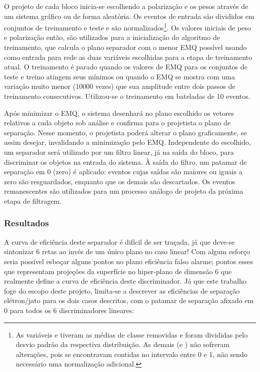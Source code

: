 O projeto de cada bloco inicia-se escolhendo a polarização e os pesos através
de um sistema gráfico ou de forma aleatória. Os eventos de entrada são
divididos em conjuntos de treinamento e teste e são normalizados\footnote{As
variáveis \etem e \ethad tiveram as médias de classe removidas e foram
divididas pelo desvio padrão da respectiva distribuição. As demais (\rstrip e
\rshape) não sofreram alterações, pois se encontravam contidas no intervalo entre
0 e 1, não sendo necessário uma normalização adicional.}. Os valores iniciais
de peso e polarização então, são utilizados para a inicialização do algoritmo
de treinamento, que calcula o plano separador com o menor EMQ possível usando
como entrada para rede as duas variáveis escolhidas para a etapa de treinamento
atual. O treinamento é parado quando os valores de EMQ para os conjuntos de
teste e treino atingem seus mínimos ou quando o EMQ se mostra com uma variação
muito menor (10000 vezes) que sua amplitude entre dois passos de treinamento
consecutivos. Utilizou-se o treinamento em bateladas de 10 eventos.

Após minimizar o EMQ, o sistema desenhará no plano escolhido os vetores
relativos a cada objeto sob análise e confirma para o projetista o plano de
separação. Nesse momento, o projetista poderá alterar o plano graficamente, se
assim desejar, invalidando a minimização pelo EMQ. Independente do escolhido,
um separador será utilizado por um filtro linear, já na saída do bloco, para
discriminar os objetos na entrada do sistema. À saída do filtro, um patamar de
separação em 0 (zero) é aplicado: eventos cujas saídas são maiores ou iguais a
zero são resguardados, enquanto que os demais são descartados. Os eventos
remanescentes são utilizados para um processo análogo de projeto da próxima
etapa de filtragem.

\subsubsection{Resultados}
\label{sec:bi-results}

A curva de eficiência deste separador é difícil de ser traçada, já que deve-se
sintonizar 6 retas ao invés de um único plano no caso linear! Com algum
esforço seria possível esboçar alguns pontos no plano eficiência
 falso alarme; pontos esses que representam projeções da superfície
no hiper-plano de dimensão 6 que realmente define a curva de eficiência deste
discriminador. Já que este trabalho foge do escopo deste projeto, limita-se a
descrever as eficiências de separação elétron/jato para os dois casos
descritos, com o patamar de separação afixado em 0 para todos os 6
discriminadores lineares:

